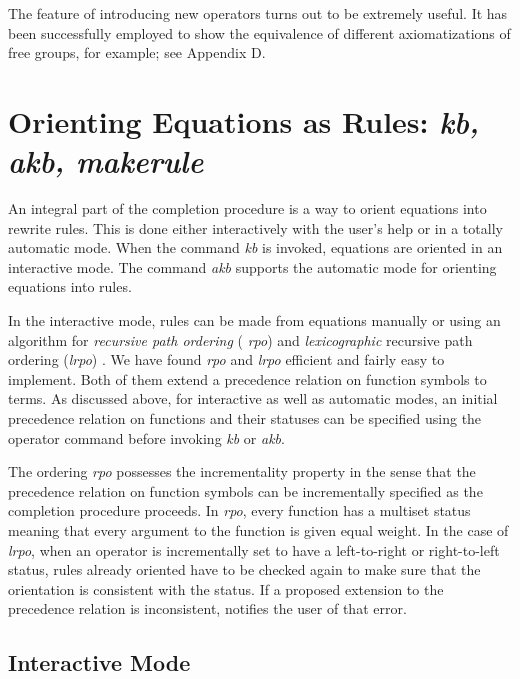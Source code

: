 The feature of introducing new operators
turns out to be extremely useful. It has been
successfully employed to show the equivalence of different
axiomatizations of free groups, for example; see Appendix D.

\section{Orienting Equations as Rules: {\em kb, akb, makerule}}
An integral part of the completion procedure is a way to orient
equations into rewrite rules.  This is done either interactively with the
user's help or in a totally automatic mode. When the command {\em kb}
is invoked, equations are oriented in an interactive mode. The command
{\em akb} supports the automatic mode for orienting equations into
rules.
  
In the interactive mode, rules can be made from equations manually
or using an algorithm for {\em recursive path ordering} ({\em
rpo})\cite{Dershowitz82} and {\em lexicographic} recursive path
ordering ({\em lrpo}) \cite{KaminLevy}\cite{Dershowitz87}.  We have
found {\em rpo} and {\em lrpo} efficient and fairly easy to implement.  Both of
them extend a precedence relation on function symbols to terms.  As
discussed above, for interactive as well as automatic modes, an
initial precedence relation on functions and their statuses can be
specified using the operator command before invoking {\em kb} or {\em
akb}.
  
The ordering {\em rpo} possesses the incrementality property in the sense that
the precedence relation on function symbols can be incrementally
specified as the completion procedure proceeds.  In {\em rpo}, every
function has a multiset status meaning that every argument to the
function is given equal weight.  In the case of {\em lrpo}, when an operator
is incrementally set to have a left-to-right or right-to-left
status, rules already oriented have to be checked again to make sure
that the orientation is consistent with the status. If a proposed
extension to the precedence relation is inconsistent, \RRL notifies the
user of that error.

\subsection{Interactive Mode}

